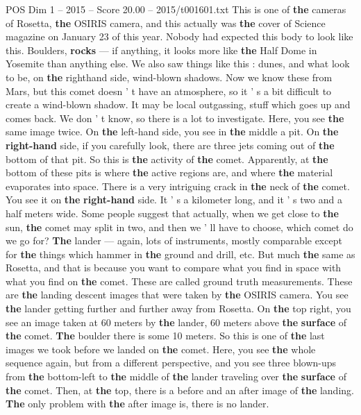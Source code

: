 \begin{textsample}{POS Dim 1 – 2015 – Score 20.00 – 2015/t001601.txt}
This is one of \textbf{the} cameras of Rosetta, \textbf{the} OSIRIS camera, and this actually was \textbf{the} cover of Science magazine on January 23 of this year.
Nobody had expected this body to look like this.
Boulders, \textbf{rocks} — if anything, it looks more like \textbf{the} Half Dome in Yosemite than anything else.
We also saw things like this : dunes, and what look to be, on \textbf{the} righthand side, wind-blown shadows.
Now we know these from Mars, but this comet doesn ' t have an atmosphere, so it ' s a bit difficult to create a wind-blown shadow.
It may be local outgassing, stuff which goes up and comes back.
We don ' t know, so there is a lot to investigate.
Here, you see \textbf{the} same image twice.
On \textbf{the} left-hand side, you see in \textbf{the} middle a pit.
On \textbf{the} \textbf{right-hand} side, if you carefully look, there are three jets coming out of \textbf{the} bottom of that pit.
So this is \textbf{the} activity of \textbf{the} comet.
Apparently, at \textbf{the} bottom of these pits is where \textbf{the} active regions are, and where \textbf{the} material evaporates into space.
There is a very intriguing crack in \textbf{the} neck of \textbf{the} comet.
You see it on \textbf{the} \textbf{right-hand} side.
It ' s a kilometer long, and it ' s two and a half meters wide.
Some people suggest that actually, when we get close to \textbf{the} sun, \textbf{the} comet may split in two, and then we ' ll have to choose, which comet do we go for? \textbf{The} lander — again, lots of instruments, mostly comparable except for \textbf{the} things which hammer in \textbf{the} ground and drill, etc.
But much \textbf{the} same as Rosetta, and that is because you want to compare what you find in space with what you find on \textbf{the} comet.
These are called ground truth measurements.
These are \textbf{the} landing descent images that were taken by \textbf{the} OSIRIS camera.
You see \textbf{the} lander getting further and further away from Rosetta.
On \textbf{the} top right, you see an image taken at 60 meters by \textbf{the} lander, 60 meters above \textbf{the} \textbf{surface} of \textbf{the} comet. \textbf{The} boulder there is some 10 meters.
So this is one of \textbf{the} last images we took before we landed on \textbf{the} comet.
Here, you see \textbf{the} whole sequence again, but from a different perspective, and you see three blown-ups from \textbf{the} bottom-left to \textbf{the} middle of \textbf{the} lander traveling over \textbf{the} \textbf{surface} of \textbf{the} comet.
Then, at \textbf{the} top, there is a before and an after image of \textbf{the} landing. \textbf{The} only problem with \textbf{the} after image is, there is no lander.

\end{textsample}
